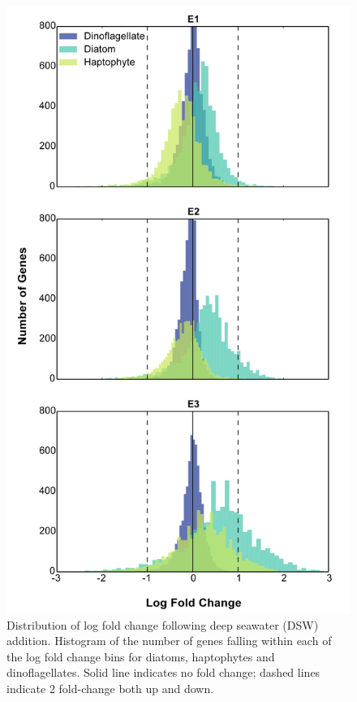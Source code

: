 
\begin{figure}[p!]
  \centering
    \includegraphics[width=.75\textwidth]{Images/C4_FigureS4.png}
    \caption[Distribution of log fold change following deep seawater (DSW) addition]{Distribution of log fold change following deep seawater (DSW) addition. Histogram of the number of genes falling within each of the log fold change bins for diatoms, haptophytes and dinoflagellates. Solid line indicates no fold change; dashed lines indicate 2 fold-change both up and down.}
  \label{fig:a4f4}
\end{figure}




